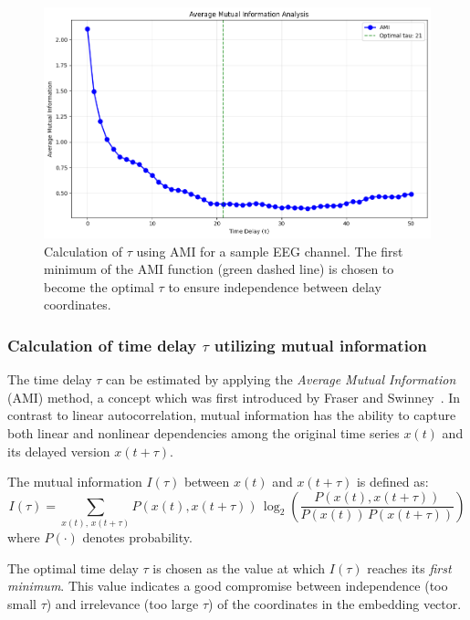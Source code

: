 \documentclass{article}
\begin{document}
			\begin{figure}[H]
				    \centering
				    \includegraphics[width=0.8\linewidth]{ami.png}
				    \caption{Calculation of $\tau$ using AMI for a sample EEG channel. The first minimum of the AMI function (green dashed line) is chosen to become the optimal $\tau$ to ensure independence between delay coordinates.}
				    \label{fig:ami_plot}
			\end{figure}



		\subsubsection{Calculation of time delay \( \tau \) utilizing mutual information}
			The time delay \( \tau \) can be estimated by applying the 
			\textit{Average Mutual Information} (AMI) method, a concept which was first introduced 
			by Fraser and Swinney~\cite{fraser1986}. 
			In contrast to linear autocorrelation, 
			mutual information has the ability to capture both linear and nonlinear dependencies among
			the original time series \( x(t) \) and its delayed version \( x(t + \tau) \).

			The mutual information \( I(\tau) \) between \( x(t) \) and \( x(t + \tau) \) is defined as:
			\[
			I(\tau) = \sum_{x(t),\, x(t+\tau)} P(x(t), x(t+\tau)) \, \log_2 \left( \frac{P(x(t), x(t+\tau))}{P(x(t)) \, P(x(t+\tau))} \right)
			\]
			where \( P(\cdot) \) denotes probability.

			The optimal time delay \( \tau \) is chosen as the value at which 
			\( I(\tau) \) reaches its \textit{first minimum}. 
			This value indicates a good compromise 
			between independence (too small \( \tau \)) and irrelevance (too large \( \tau \)) 
			of the coordinates in the embedding vector.
				

		
\end{document}
